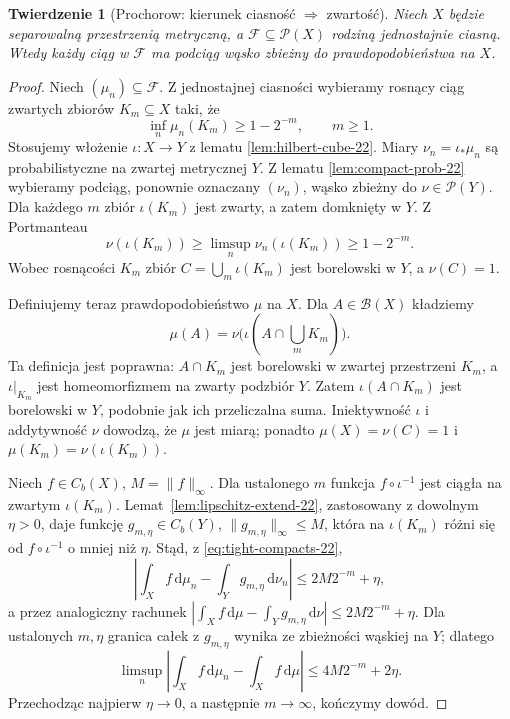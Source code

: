 \documentclass[11pt,a4paper,oneside]{book}
\numberwithin{equation}{chapter}
\theoremstyle{plain}
\newtheorem{twierdzenie}{Twierdzenie}[chapter]
\theoremstyle{definition}
\theoremstyle{remark}
\begin{document}
\begin{twierdzenie}[Prochorow: kierunek ciasność $\Rightarrow$ zwartość]
\label{thm:prokhorov-forward-22}
Niech $X$ będzie separowalną przestrzenią metryczną,
a $\mathcal F\subseteq\mathcal P(X)$ rodziną jednostajnie
ciasną. Wtedy każdy ciąg w $\mathcal F$ ma podciąg
wąsko zbieżny do prawdopodobieństwa na $X$.
\end{twierdzenie}
\begin{proof}
Niech $(\mu_n)\subseteq\mathcal F$.
Z jednostajnej ciasności wybieramy rosnący ciąg
zwartych zbiorów $K_m\subseteq X$ taki, że
\begin{equation}\label{eq:tight-compacts-22}
 \inf_n\mu_n(K_m)\ge1-2^{-m},\qquad m\ge1.
\end{equation}
Stosujemy włożenie $\iota:X\to Y$ z lematu
\ref{lem:hilbert-cube-22}. Miary
$\nu_n=\iota_*\mu_n$ są probabilistyczne na
zwartej metrycznej $Y$. Z lematu
\ref{lem:compact-prob-22} wybieramy podciąg,
ponownie oznaczany $(\nu_n)$, wąsko zbieżny
do $\nu\in\mathcal P(Y)$.
Dla każdego $m$ zbiór $\iota(K_m)$ jest zwarty,
a zatem domknięty w $Y$. Z Portmanteau
\[
\nu(\iota(K_m))\ge\limsup_n\nu_n(\iota(K_m))
\ge1-2^{-m}.
\]
Wobec rosnącości $K_m$ zbiór
$C=\bigcup_m\iota(K_m)$ jest borelowski w $Y$,
a $\nu(C)=1$.

Definiujemy teraz prawdopodobieństwo $\mu$ na $X$.
Dla $A\in\mathcal B(X)$ kładziemy
\begin{equation}\label{eq:pullback-limit-22}
\mu(A)=\nu\bigl(\iota(A\cap\bigcup_mK_m)\bigr).
\end{equation}
Ta definicja jest poprawna: $A\cap K_m$ jest
borelowski w zwartej przestrzeni $K_m$,
a $\iota|_{K_m}$ jest homeomorfizmem na zwarty
podzbiór $Y$. Zatem $\iota(A\cap K_m)$ jest
borelowski w $Y$, podobnie jak ich przeliczalna suma.
Iniektywność $\iota$ i addytywność $\nu$ dowodzą,
że $\mu$ jest miarą; ponadto $\mu(X)=\nu(C)=1$
i $\mu(K_m)=\nu(\iota(K_m))$.

Niech $f\in C_b(X)$, $M=\|f\|_\infty$.
Dla ustalonego $m$ funkcja $f\circ\iota^{-1}$
jest ciągła na zwartym $\iota(K_m)$.
Lemat~\ref{lem:lipschitz-extend-22}, zastosowany
z dowolnym $\eta>0$, daje funkcję
$g_{m,\eta}\in C_b(Y)$, $\|g_{m,\eta}\|_\infty\le M$,
która na $\iota(K_m)$ różni się od
$f\circ\iota^{-1}$ o mniej niż $\eta$.
Stąd, z \eqref{eq:tight-compacts-22},
\[
\left|\int_X f\,\mathrm d\mu_n-
\int_Y g_{m,\eta}\,\mathrm d\nu_n\right|\le2M2^{-m}+\eta,
\]
a przez analogiczny rachunek
$|\int_Xf\,\mathrm d\mu-\int_Yg_{m,\eta}\,\mathrm d\nu|
\le2M2^{-m}+\eta$.
Dla ustalonych $m,\eta$ granica całek z $g_{m,\eta}$ wynika
ze zbieżności wąskiej na $Y$; dlatego
\[
\limsup_n\left|\int_X f\,\mathrm d\mu_n-
\int_X f\,\mathrm d\mu\right|\le4M2^{-m}+2\eta.
\]
Przechodząc najpierw $\eta\to0$, a następnie
$m\to\infty$, kończymy dowód.
\end{proof}
\end{document}
